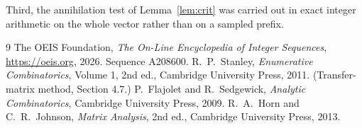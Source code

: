 \documentclass[11pt,a4paper]{article}
\theoremstyle{plain}
\theoremstyle{definition}
\begin{document}
Third, the annihilation test of Lemma~\ref{lem:crit} was carried out in exact integer
arithmetic on the whole vector rather than on a sampled prefix.

\begin{thebibliography}{9}
 The OEIS Foundation, \emph{The On-Line Encyclopedia of Integer
Sequences}, \url{https://oeis.org}, 2026. Sequence A208600.
 R.~P.~Stanley, \emph{Enumerative Combinatorics}, Volume 1, 2nd ed.,
Cambridge University Press, 2011. (Transfer-matrix method, Section 4.7.)
 P.~Flajolet and R.~Sedgewick, \emph{Analytic Combinatorics}, Cambridge
University Press, 2009.
 R.~A.~Horn and C.~R.~Johnson, \emph{Matrix Analysis}, 2nd ed., Cambridge
University Press, 2013.
\end{thebibliography}
\end{document}

